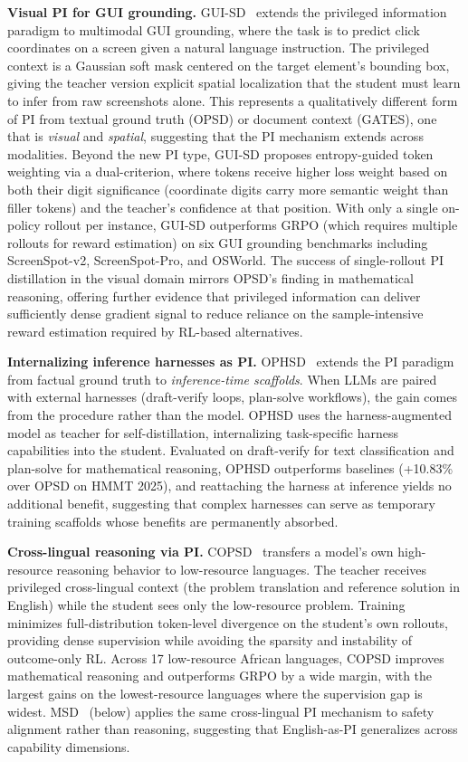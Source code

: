 \documentclass{article} %
\begin{document}
\textbf{Visual PI for GUI grounding.} GUI-SD~\citep{2605.00642} extends the privileged information paradigm to multimodal GUI grounding, where the task is to predict click coordinates on a screen given a natural language instruction. The privileged context is a Gaussian soft mask centered on the target element's bounding box, giving the teacher version explicit spatial localization that the student must learn to infer from raw screenshots alone. This represents a qualitatively different form of PI from textual ground truth (OPSD) or document context (GATES), one that is \emph{visual} and \emph{spatial}, suggesting that the PI mechanism extends across modalities. Beyond the new PI type, GUI-SD proposes entropy-guided token weighting via a dual-criterion, where tokens receive higher loss weight based on both their digit significance (coordinate digits carry more semantic weight than filler tokens) and the teacher's confidence at that position. With only a single on-policy rollout per instance, GUI-SD outperforms GRPO (which requires multiple rollouts for reward estimation) on six GUI grounding benchmarks including ScreenSpot-v2, ScreenSpot-Pro, and OSWorld. The success of single-rollout PI distillation in the visual domain mirrors OPSD's finding in mathematical reasoning, offering further evidence that privileged information can deliver sufficiently dense gradient signal to reduce reliance on the sample-intensive reward estimation required by RL-based alternatives.

\textbf{Internalizing inference harnesses as PI.} OPHSD~\citep{2605.08741} extends the PI paradigm from factual ground truth to \emph{inference-time scaffolds}. When LLMs are paired with external harnesses (draft-verify loops, plan-solve workflows), the gain comes from the procedure rather than the model. OPHSD uses the harness-augmented model as teacher for self-distillation, internalizing task-specific harness capabilities into the student. Evaluated on draft-verify for text classification and plan-solve for mathematical reasoning, OPHSD outperforms baselines (+10.83\% over OPSD on HMMT 2025), and reattaching the harness at inference yields no additional benefit, suggesting that complex harnesses can serve as temporary training scaffolds whose benefits are permanently absorbed.

\textbf{Cross-lingual reasoning via PI.} COPSD~\citep{2605.09548} transfers a model's own high-resource reasoning behavior to low-resource languages. The teacher receives privileged cross-lingual context (the problem translation and reference solution in English) while the student sees only the low-resource problem. Training minimizes full-distribution token-level divergence on the student's own rollouts, providing dense supervision while avoiding the sparsity and instability of outcome-only RL. Across 17 low-resource African languages, COPSD improves mathematical reasoning and outperforms GRPO by a wide margin, with the largest gains on the lowest-resource languages where the supervision gap is widest. MSD~\citep{2605.02971} (below) applies the same cross-lingual PI mechanism to safety alignment rather than reasoning, suggesting that English-as-PI generalizes across capability dimensions.
\end{document}
